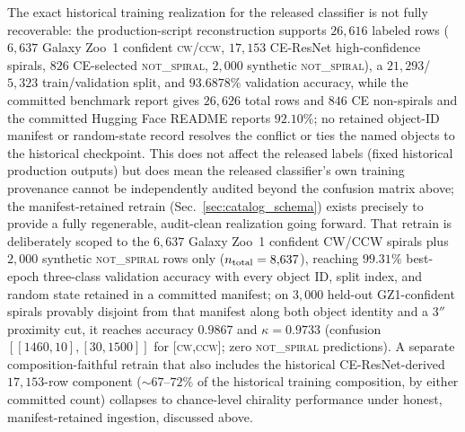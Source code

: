 \documentclass[twocolumn,linenumbers]{aastex702}
\newcommand{\CW}{\textsc{cw}}
\newcommand{\CCW}{\textsc{ccw}}
\newcommand{\NS}{\textsc{not\_spiral}}
\begin{document}
The exact historical training realization for the released classifier is
not fully recoverable: the production-script reconstruction supports
$26{,}616$ labeled rows ($6{,}637$ Galaxy Zoo~1 confident \CW/\CCW,
$17{,}153$ CE-ResNet high-confidence spirals, $826$ CE-selected \NS,
$2{,}000$ synthetic \NS), a $21{,}293$/$5{,}323$ train/validation split, and
$93.6878\%$ validation accuracy, while the committed benchmark report gives
$26{,}626$ total rows and $846$ CE non-spirals and the committed Hugging
Face README reports $92.10\%$; no retained object-ID manifest or
random-state record resolves the conflict or ties the named objects to the
historical checkpoint. This does not affect the released labels (fixed
historical production outputs) but does mean the released classifier's own
training provenance cannot be independently audited beyond the confusion
matrix above; the manifest-retained retrain
(Sec.~\ref{sec:catalog_schema}) exists precisely to provide a fully
regenerable, audit-clean realization going forward. That retrain is
deliberately scoped to the $6{,}637$ Galaxy Zoo~1 confident CW/CCW spirals
plus $2{,}000$ synthetic \NS{} rows only ($n_{\rm total}=8{,}637$),
reaching $99.31\%$ best-epoch three-class validation accuracy with every
object ID, split index, and random state retained in a committed manifest;
on $3{,}000$ held-out GZ1-confident spirals provably disjoint from that
manifest along both object identity and a $3''$ proximity cut, it reaches
accuracy $0.9867$ and $\kappa=0.9733$ (confusion $[[1460,10],[30,1500]]$ for
[\CW,\CCW]; zero \NS{} predictions). A separate composition-faithful
retrain that also includes the historical CE-ResNet-derived $17{,}153$-row
component (${\sim}67$--$72\%$ of the historical training composition, by
either committed count) collapses to chance-level chirality performance
under honest, manifest-retained ingestion, discussed above.
\end{document}
